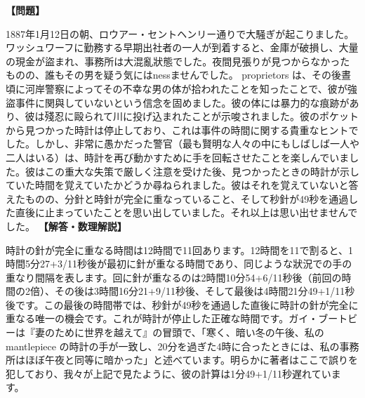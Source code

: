 \documentclass[10pt,a4paper,oneside,openany]{ltjsbook}
\begin{document}
\begin{tcolorbox}[colback=softblue,colframe=primaryblue,title=\textbf{第 60 問：ワッシュワーフの謎 （原題: THE WAPSHAW'S WHARF MYSTERY.）},arc=2mm,boxrule=1pt,breakable]
\textbf{【問題】}\par\vspace{0.3em}
1887年1月12日の朝、ロウアー・セントヘンリー通りで大騒ぎが起こりました。ワッシュワーフに勤務する早期出社者の一人が到着すると、金庫が破損し、大量の現金が盜まれ、事務所は大混亂狀態でした。夜間見張りが見つからなかったものの、誰もその男を疑う気にはnessませんでした。 proprietors は、その後晝頃に河岸警察によってその不幸な男の体が拾われたことを知ったことで、彼が強盜事件に関與していないという信念を固めました。彼の体には暴力的な痕跡があり、彼は殘忍に毆られて川に投げ込まれたことが示唆されました。彼のポケットから見つかった時計は停止しており、これは事件の時間に関する貴重なヒントでした。しかし、非常に愚かだった警官（最も賢明な人々の中にもしばしば一人や二人はいる）は、時計を再び動かすために手を回転させたことを楽しんでいました。彼はこの重大な失策で厳しく注意を受けた後、見つかったときの時計が示していた時間を覚えていたかどうか尋ねられました。彼はそれを覚えていないと答えたものの、分針と時針が完全に重なっていること、そして秒針が49秒を通過した直後に止まっていたことを思い出していました。それ以上は思い出せませんでした。
\tcblower
\textbf{【解答・数理解説】}\par\vspace{0.3em}
時計の針が完全に重なる時間は12時間で11回あります。12時間を11で割ると、1時間5分27+3/11秒後が最初に針が重なる時間であり、同じような狀況での手の重なり間隔を表します。回に針が重なるのは2時間10分54+6/11秒後（前回の時間の2倍）、その後は3時間16分21+9/11秒後、そして最後は4時間21分49+1/11秒後です。この最後の時間帯では、秒針が49秒を通過した直後に時計の針が完全に重なる唯一の機会です。これが時計が停止した正確な時間です。ガイ・ブートビーは『妻のために世界を越えて』の冒頭で、「寒く、暗い冬の午後、私の mantlepiece の時計の手が一致し、20分を過ぎた4時に合ったときには、私の事務所はほぼ午夜と同等に暗かった」と述べています。明らかに著者はここで誤りを犯しており、我々が上記で見たように、彼の計算は1分49+1/11秒遅れています。
\end{tcolorbox}
\end{document}
